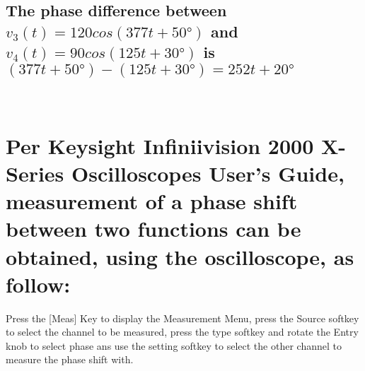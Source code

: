 \documentclass{article}
\begin{document}
\subsection{The phase difference between $v_3(t)=120cos(377 t+\ang{50})$ and $v_4(t)=90cos(125 t+\ang{30})$ is $(377 t+\ang{50})-(125 t+\ang{30})=252 t+\ang{20}$}

\,\\

\section{Per Keysight Infiniivision 2000 X-Series Oscilloscopes User's Guide, measurement of a phase shift between two functions can be obtained, using the oscilloscope, as follow:}

Press the [Meas] Key to display the Measurement Menu, press the Source softkey to select the channel to be measured, press the type softkey and rotate the Entry knob to select phase ans use the setting softkey to select the other channel to measure the phase shift with.
\end{document}
